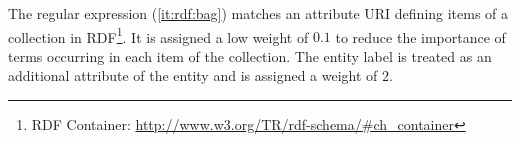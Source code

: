 The regular expression (\ref{it:rdf:bag}) matches an attribute URI defining items of a collection in RDF\footnote{RDF Container: \url{http://www.w3.org/TR/rdf-schema/\#ch\_container}}. It is assigned a low weight of $0.1$ to reduce the importance of terms occurring in each item of the collection. The entity label is treated as an additional attribute of the entity and is assigned a weight of $2$.
